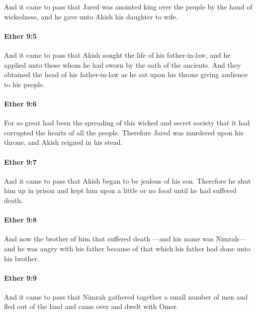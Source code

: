 			And it came to pass that
			Jared was anointed king over the people by the hand of wickedness,
			and he gave unto Akish his daughter to wife.

		\paragraph{Ether 9:5} %
			\label{ETHER-9-5}

			And it came to pass that Akish sought the life of his father-in-law,
			and he applied unto those whom he had sworn by the oath of the ancients.
			And they obtained the head of his father-in-law
			as he sat upon his throne giving audience to his people.

		\paragraph{Ether 9:6} %
			\label{ETHER-9-6}

			For so great had been the spreading of this wicked and secret society
			that it had corrupted the hearts of all the people.
			Therefore Jared was murdered upon his throne,
			and Akish reigned in his stead.

		\paragraph{Ether 9:7} %
			\label{ETHER-9-7}

			And it came to pass that Akish began to be jealous of his son.
			Therefore he shut him up in prison
			and kept him upon a little or no food
			until he had suffered death.

		\paragraph{Ether 9:8} %
			\label{ETHER-9-8}

			And now the brother of him that suffered death
			---and his name was Nimrah---
			and he was angry with his father
			because of that which his father had done unto his brother.

		\paragraph{Ether 9:9} %
			\label{ETHER-9-9}

			And it came to pass that Nimrah gathered together a small number of men
			and fled out of the land
			and came over and dwelt with Omer.

